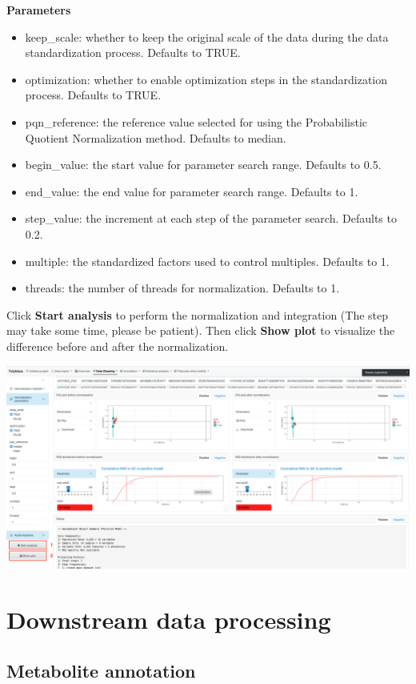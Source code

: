 \documentclass[
]{book}
\providecommand{\tightlist}{%
  \setlength{\itemsep}{0pt}\setlength{\parskip}{0pt}}
\begin{document}
\textbf{Parameters}

\begin{itemize}
\tightlist
\item
  keep\_scale: whether to keep the original scale of the data during the data standardization process. Defaults to TRUE.
\item
  optimization: whether to enable optimization steps in the standardization process. Defaults to TRUE.
\item
  pqn\_reference: the reference value selected for using the Probabilistic Quotient Normalization method. Defaults to median.
\item
  begin\_value: the start value for parameter search range. Defaults to 0.5.
\item
  end\_value: the end value for parameter search range. Defaults to 1.
\item
  step\_value: the increment at each step of the parameter search. Defaults to 0.2.
\item
  multiple: the standardized factors used to control multiples. Defaults to 1.
\item
  threads: the number of threads for normalization. Defaults to 1.
\end{itemize}

Click \textbf{Start analysis} to perform the normalization and integration (The step may take some time, please be patient). Then click \textbf{Show plot} to visualize the difference before and after the normalization.

\includegraphics{figures/normaliztion.png}

\chapter{Downstream data processing}\label{downstream-data-processing}

\section{Metabolite annotation}\label{metabolite-annotation}
\end{document}
